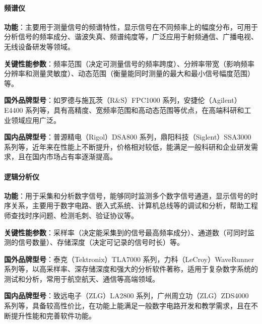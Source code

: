 \documentclass[./测控三级项目.tex]{subfiles} %
\begin{document}
			\paragraph{\qquad 频谱仪}\par
			\textbf{功能}：主要用于测量信号的频谱特性，显示信号在不同频率上的幅度分布，可用于分析信号的频率成分、谐波失真、频谱纯度等，广泛应用于射频通信、广播电视、无线设备研发等领域。\par
			\textbf{关键性能参数}：频率范围（决定可测量信号的频率跨度）、分辨率带宽（影响频率分辨率和测量灵敏度）、动态范围（衡量能同时测量的最大和最小信号幅度范围）等。\par
			\textbf{国外品牌型号}：如罗德与施瓦茨（R\&S）FPC1000 系列，安捷伦（Agilent）E4400 系列等，具有高精度、宽频率范围和高动态范围等优点，在高端科研和工业领域应用广泛。\par
			\textbf{国内品牌型号}：普源精电（Rigol）DSA800 系列，鼎阳科技（Siglent）SSA3000 系列等，近年来在性能上不断提升，价格相对较低，能满足一般科研和企业研发需求，且在国内市场占有率逐渐提高。\par
			\paragraph{\qquad 逻辑分析仪}\par
			\textbf{功能}：用于采集和分析数字信号，能够同时监测多个数字信号通道，显示信号的时序关系，主要用于数字电路、嵌入式系统、计算机总线等的调试和分析，帮助工程师查找时序问题、检测毛刺、验证协议等。\par
			\textbf{关键性能参数}：采样率（决定能采集到的信号最高频率成分）、通道数（可同时监测的信号数量）、存储深度（决定可记录的信号时长）等。\par
			\textbf{国外品牌型号}：泰克（Tektronix）TLA7000 系列，力科（LeCroy）WaveRunner 系列等，以高采样率、深存储深度和强大的分析软件著称，适用于复杂数字系统的测试和分析，常用于航空航天、通信等高端领域。\par
			\textbf{国内品牌型号}：致远电子（ZLG）LA2800 系列，广州周立功（ZLG）ZDS4000 系列等，具备较高性价比，在功能上能满足一般数字电路开发和教学需求，且在不断提升性能和完善软件功能。\par
\end{document}
